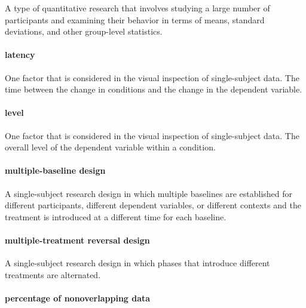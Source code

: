 \documentclass[
]{krantz}
\begin{document}
A type of quantitative research that involves studying a large number of participants and examining their behavior in terms of means, standard deviations, and other group-level statistics.

\hypertarget{latency}{%
\paragraph*{latency}\label{latency}}

One factor that is considered in the visual inspection of single-subject data. The time between the change in conditions and the change in the dependent variable.

\hypertarget{level}{%
\paragraph*{level}\label{level}}

One factor that is considered in the visual inspection of single-subject data. The overall level of the dependent variable within a condition.

\hypertarget{multiple-baseline-design}{%
\paragraph*{multiple-baseline design}\label{multiple-baseline-design}}

A single-subject research design in which multiple baselines are established for different participants, different dependent variables, or different contexts and the treatment is introduced at a different time for each baseline.

\hypertarget{multiple-treatment-reversal-design}{%
\paragraph*{multiple-treatment reversal design}\label{multiple-treatment-reversal-design}}

A single-subject research design in which phases that introduce different treatments are alternated.

\hypertarget{percentage-of-nonoverlapping-data}{%
\paragraph*{percentage of nonoverlapping data}\label{percentage-of-nonoverlapping-data}}
\end{document}
